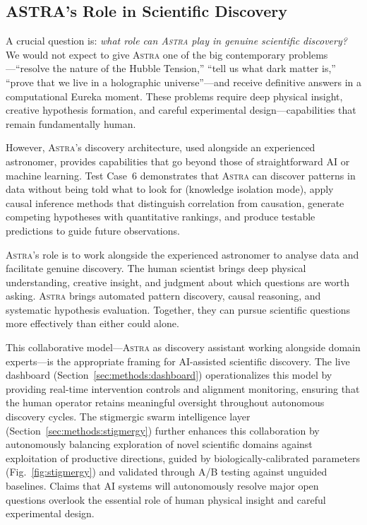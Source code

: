 \documentclass[usenatbib]{rasti}
\newcommand{\astra}{\textsc{Astra}\xspace}
\begin{document}
\subsection{ASTRA's Role in Scientific Discovery}
\label{sec:discussion:role}

A crucial question is: \emph{what role can \astra play in genuine scientific discovery?}
We would not expect to give \astra one of the big contemporary problems---``resolve the nature of the Hubble Tension,'' ``tell us what dark matter is,'' ``prove that we live in a holographic universe''---and receive definitive answers in a computational Eureka moment.
These problems require deep physical insight, creative hypothesis formation, and careful experimental design---capabilities that remain fundamentally human.

However, \astra's discovery architecture, used alongside an experienced astronomer, provides capabilities that go beyond those of straightforward AI or machine learning.
Test Case~6 demonstrates that \astra can discover patterns in data without being told what to look for (knowledge isolation mode), apply causal inference methods that distinguish correlation from causation, generate competing hypotheses with quantitative rankings, and produce testable predictions to guide future observations.

\astra's role is to work alongside the experienced astronomer to analyse data and facilitate genuine discovery.
The human scientist brings deep physical understanding, creative insight, and judgment about which questions are worth asking.
\astra brings automated pattern discovery, causal reasoning, and systematic hypothesis evaluation.
Together, they can pursue scientific questions more effectively than either could alone.

This collaborative model---\astra as discovery assistant working alongside domain experts---is the appropriate framing for AI-assisted scientific discovery.
The live dashboard (Section~\ref{sec:methods:dashboard}) operationalizes this model by providing real-time intervention controls and alignment monitoring, ensuring that the human operator retains meaningful oversight throughout autonomous discovery cycles.
The stigmergic swarm intelligence layer (Section~\ref{sec:methods:stigmergy}) further enhances this collaboration by autonomously balancing exploration of novel scientific domains against exploitation of productive directions, guided by biologically-calibrated parameters (Fig.~\ref{fig:stigmergy}) and validated through A/B testing against unguided baselines.
Claims that AI systems will autonomously resolve major open questions overlook the essential role of human physical insight and careful experimental design.
\end{document}
